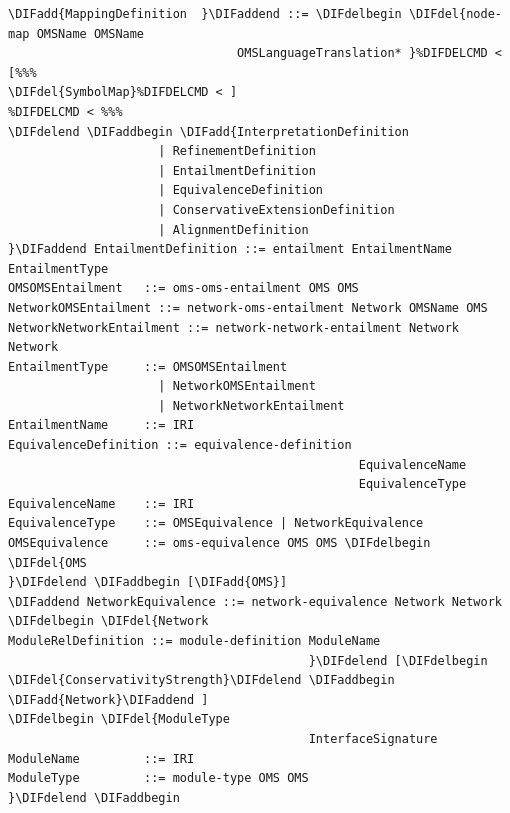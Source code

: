 \documentclass[10pt,fleqn,final]{scrreprt}
\newenvironment{definitions}[0]{\medskip }{}
\providecommand{\DIFadd}[1]{{\protect\color{blue}\uwave{#1}}} %
\providecommand{\DIFdel}[1]{{\protect\color{red}\sout{#1}}}                      %
\providecommand{\DIFaddbegin}{} %
\providecommand{\DIFaddend}{} %
\providecommand{\DIFdelbegin}{} %
\providecommand{\DIFdelend}{} %
\begin{document}
\begin{definitions}
\begin{lstlisting}[language=ebnf,escapeinside={<>},mathescape]  %DIF >  abstract syntax
\DIFadd{MappingDefinition  }\DIFaddend ::= \DIFdelbegin \DIFdel{node-map OMSName OMSName
                                OMSLanguageTranslation* }%DIFDELCMD < [%%%
\DIFdel{SymbolMap}%DIFDELCMD < ]
%DIFDELCMD < %%%
\DIFdelend \DIFaddbegin \DIFadd{InterpretationDefinition
                     | RefinementDefinition
                     | EntailmentDefinition
                     | EquivalenceDefinition
                     | ConservativeExtensionDefinition
                     | AlignmentDefinition
}\DIFaddend EntailmentDefinition ::= entailment EntailmentName EntailmentType
OMSOMSEntailment   ::= oms-oms-entailment OMS OMS
NetworkOMSEntailment ::= network-oms-entailment Network OMSName OMS
NetworkNetworkEntailment ::= network-network-entailment Network Network
EntailmentType     ::= OMSOMSEntailment
                     | NetworkOMSEntailment
                     | NetworkNetworkEntailment
EntailmentName     ::= IRI
EquivalenceDefinition ::= equivalence-definition
                                                 EquivalenceName
                                                 EquivalenceType
EquivalenceName    ::= IRI
EquivalenceType    ::= OMSEquivalence | NetworkEquivalence
OMSEquivalence     ::= oms-equivalence OMS OMS \DIFdelbegin \DIFdel{OMS
}\DIFdelend \DIFaddbegin [\DIFadd{OMS}]
\DIFaddend NetworkEquivalence ::= network-equivalence Network Network \DIFdelbegin \DIFdel{Network
ModuleRelDefinition ::= module-definition ModuleName
                                          }\DIFdelend [\DIFdelbegin \DIFdel{ConservativityStrength}\DIFdelend \DIFaddbegin \DIFadd{Network}\DIFaddend ]
\DIFdelbegin \DIFdel{ModuleType
                                          InterfaceSignature
ModuleName         ::= IRI
ModuleType         ::= module-type OMS OMS
}\DIFdelend \DIFaddbegin \end{lstlisting}


\end{definitions}
\end{document}
